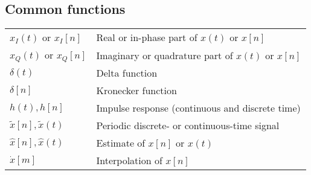 \documentclass{article}
\begin{document}
\subsection{Common functions}
\begin{xltabular}{\textwidth}{XX}
    \(x_I(t)\) or \(x_I[n]\) & Real or in-phase part of \(x(t)\) or \(x[n]\)\\
    \(x_Q(t)\) or \(x_Q[n]\) & Imaginary or quadrature part of \(x(t)\) or \(x[n]\)\\
    \(\delta(t)\) & Delta function\\
    \(\delta[n]\) & Kronecker function\\
    \(h(t), h[n]\) & Impulse response (continuous and discrete time)\\
    \(\tilde{x}[n], \tilde{x}(t)\) & Periodic discrete- or continuous-time signal\\
    \(\hat{x}[n], \hat{x}(t)\) & Estimate of \({x}[n]\) or \({x}(t)\)\\
    \(\dot{x}[m]\) & Interpolation of \({x}[n]\)\\
\end{xltabular}
\end{document}
